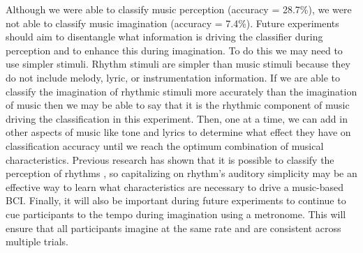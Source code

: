 Although we were able to classify music perception (accuracy = 28.7\%), we were not able to classify music imagination (accuracy = 7.4\%).
Future experiments should aim to disentangle what information is driving the classifier during perception and to enhance this during imagination.
To do this we may need to use simpler stimuli.
Rhythm stimuli are simpler than music stimuli because they do not include melody, lyric, or instrumentation information. 
If we are able to classify the imagination of rhythmic stimuli more accurately than the imagination of music then we may be able to say that it is the rhythmic component of music driving the classification in this experiment.
Then, one at a time, we can add in other aspects of music like tone and lyrics to determine what effect they have on classification accuracy until we reach the optimum combination of musical characteristics.
Previous research has shown that it is possible to classify the perception of rhythms \cite{stober2014audiomostly}, so capitalizing on rhythm's auditory simplicity may be an effective way to learn what characteristics are necessary to drive a music-based \ac{BCI}.
Finally, it will also be important during future experiments to continue to cue participants to the tempo during imagination using a metronome.
This will ensure that all participants imagine at the same rate and are consistent across multiple trials.